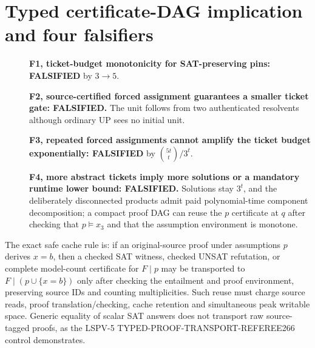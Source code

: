 \documentclass[11pt]{article}
\begin{document}
\section{Typed certificate-DAG implication and four falsifiers}
\begin{description}
\item[] \textbf{F1, ticket-budget monotonicity for SAT-preserving pins: FALSIFIED} by $3\to5$.
\item[] \textbf{F2, source-certified forced assignment guarantees a smaller ticket gate: FALSIFIED.} The unit follows from two authenticated resolvents although ordinary UP sees no initial unit.
\item[] \textbf{F3, repeated forced assignments cannot amplify the ticket budget exponentially: FALSIFIED} by $\binom{5t}{t}/3^t$.
\item[] \textbf{F4, more abstract tickets imply more solutions or a mandatory runtime lower bound: FALSIFIED.} Solutions stay $3^t$, and the deliberately disconnected products admit paid polynomial-time component decomposition; a compact proof DAG can reuse the $p$ certificate at $q$ after checking that $p\models x_3$ and that the assumption environment is monotone.
\end{description}
The exact safe cache rule is: if an original-source proof under assumptions $p$ derives $x=b$, then a checked SAT witness, checked UNSAT refutation, or complete model-count certificate for $F\mid p$ may be transported to $F\mid(p\cup\{x=b\})$ only after checking the entailment and proof environment, preserving source IDs and counting multiplicities. Such reuse must charge source reads, proof translation/checking, cache retention and simultaneous peak writable space. Generic equality of scalar SAT answers does not transport raw source-tagged proofs, as the LSPV-5 TYPED-PROOF-TRANSPORT-REFEREE266 control demonstrates.
\end{document}
